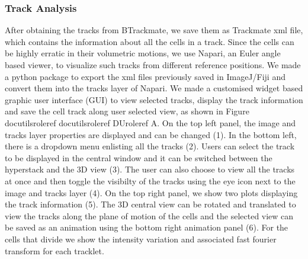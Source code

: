 \documentclass[letterpaper,compsoc,twoside,onecolumn]{IEEEtran}
\providecommand*{\DUrole}[2]{%
  \ifcsname docutilsrole#1\endcsname%
    \csname docutilsrole#1\endcsname{#2}%
  \else
    \csname DUrole#1\endcsname{#2}%
  \fi%
}
\begin{document}
\subsubsection{Track Analysis%
  \label{track-analysis}%
}


After obtaining the tracks from BTrackmate, we save them as Trackmate xml file, which contains the information about all the cells in a track. Since the cells can be highly erratic in their volumetric motions, we use Napari, an Euler angle based viewer, to visualize such tracks from different reference positions.  We made a python package to export the xml files previously saved in ImageJ/Fiji and convert them into the tracks layer of Napari. We made a customised widget based graphic user interface (GUI) to view selected tracks, display the track information and save the cell track along user selected view, as shown in
Figure \DUrole{ref}{intensity-napari} A. On the top left panel, the image and tracks layer properties are displayed and can be changed (1). In the bottom left, there is a dropdown menu enlisting all the tracks (2). Users can select the track to be displayed in the central window and it can be switched between the hyperstack and the 3D view (3). The user can also choose to view all the tracks at once and then toggle the visibilty of the tracks using the eye icon next to the image and tracks layer (4). On the top right panel, we show two plots displaying the track information (5). The 3D central view can be rotated and translated to view the tracks along the plane of motion of the cells and the selected view can be saved as an animation using the bottom right animation panel (6). For the cells that divide we show the intensity variation and associated fast fourier transform for each tracklet.
\end{document}
